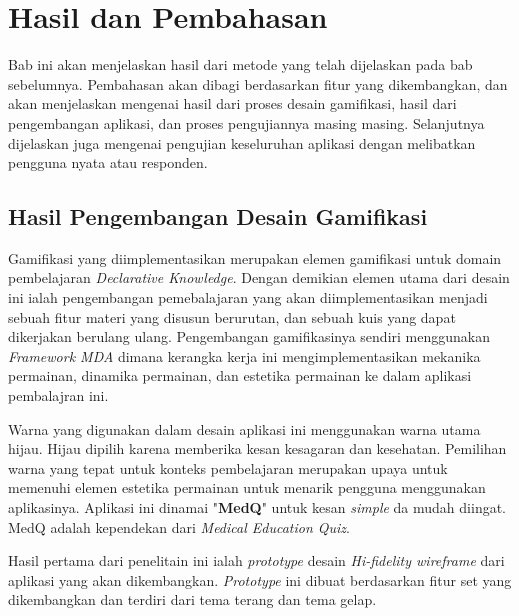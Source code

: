 \chapter{Hasil dan Pembahasan}
Bab ini akan menjelaskan hasil dari metode yang telah dijelaskan pada bab sebelumnya. 
Pembahasan akan dibagi berdasarkan fitur yang dikembangkan, dan akan menjelaskan mengenai hasil dari proses desain gamifikasi, hasil dari pengembangan aplikasi, dan proses pengujiannya masing masing.
Selanjutnya dijelaskan juga mengenai pengujian keseluruhan aplikasi dengan melibatkan pengguna nyata atau responden.

\section{Hasil Pengembangan Desain Gamifikasi}
Gamifikasi yang diimplementasikan merupakan elemen gamifikasi untuk domain pembelajaran \textit{Declarative Knowledge}.
Dengan demikian elemen utama dari desain ini ialah pengembangan pemebalajaran yang akan diimplementasikan menjadi sebuah fitur materi yang disusun berurutan, dan sebuah kuis yang dapat dikerjakan berulang ulang.
Pengembangan gamifikasinya sendiri menggunakan \textit{Framework MDA} dimana kerangka kerja ini mengimplementasikan mekanika permainan, dinamika permainan, dan estetika permainan ke dalam aplikasi pembalajran ini.

Warna yang digunakan dalam desain aplikasi ini menggunakan warna utama hijau.
Hijau dipilih karena memberika kesan kesagaran dan kesehatan.
Pemilihan warna yang tepat untuk konteks pembelajaran merupakan upaya untuk memenuhi elemen estetika permainan untuk menarik pengguna menggunakan aplikasinya.  
Aplikasi ini dinamai "\textbf{MedQ}" untuk kesan \textit{simple} da mudah diingat. MedQ adalah kependekan dari \textit{Medical Education Quiz}.

Hasil pertama dari penelitain ini ialah \textit{prototype} desain \textit{Hi-fidelity wireframe} dari aplikasi yang akan dikembangkan.
\textit{Prototype} ini dibuat berdasarkan fitur set yang dikembangkan dan terdiri dari tema terang dan tema gelap.
